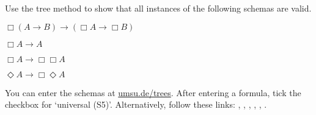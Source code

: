 \begin{exercise}
  Use the tree method to show that all instances of the following schemas are valid.
   \begin{exlist}
   \item[\pr{K}] $\Box (A \to B) \to (\Box A \to \Box B)$
   \item[\pr{T}] $\Box A \to A$
   \item[\pr{4}] $\Box A \to \Box \Box A$
   \item[\pr{5}] $\Diamond A \to \Box \Diamond A$
   \end{exlist}
\end{exercise}
\begin{solution}
  You can enter the schemas at
  \href{https://www.umsu.de/trees/}{umsu.de/trees}.
  After entering a formula, tick the checkbox for `universal (S5)'.
  Alternatively, follow these links:
  \href{https://www.umsu.de/trees/#~8(A~5B)~5(~8A~5~8B)||universality}{}, \href{https://www.umsu.de/trees/#~8A~5A||universality}{},
  \href{https://www.umsu.de/trees/#~8A~5~9A||universality}{},
  \href{https://www.umsu.de/trees/#~8A~5~8~8A||universality}{},
  \href{https://www.umsu.de/trees/#~9A~5~8~9A||universality}{},
  \href{https://www.umsu.de/trees/#~9~8A~5~8~9A||universality}{}.
\end{solution}

